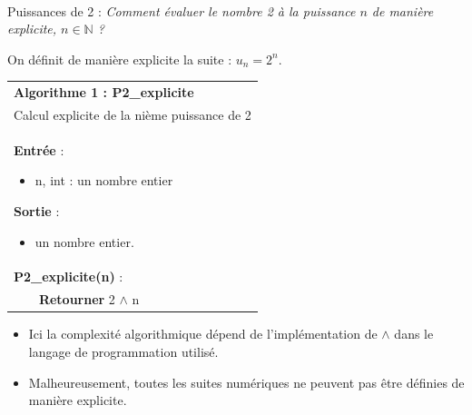 \documentclass[10pt,fleqn]{article} %
\newcommand{\bfsf}[1]{\small\textbf{\textsf{#1}}}%
\begin{document}
\begin{exemple}
$\;$

Puissances de 2 : \textit{Comment évaluer le nombre 2 à la puissance $n$ de manière explicite, $n\in \mathbb{N}$ ?}

On définit de manière explicite la suite :  $u_n=2^n$.

\begin{pseudo}
\begin{tabular}{p{.5cm}p{6cm}}
\hline
\multicolumn{2}{l}{ \textbf{Algorithme 1 : P2\_explicite}}\\
\multicolumn{2}{l}{Calcul explicite de la nième puissance de 2} \\
\hline
\multicolumn{2}{p{6.5cm}}{
\textbf{Entrée} : 
\begin{itemize}
\item n, int  : un nombre entier
\end{itemize}
\textbf{Sortie} : 
\begin{itemize}
\item un nombre entier.
\end{itemize}}\\
\multicolumn{2}{l}{\bfsf{P2\_explicite(n)} :}  \\
& \bfsf{Retourner} 2 $\wedge$ n\\
\hline
\end{tabular}
\end{pseudo}


\end{exemple}




\begin{rem}
\begin{itemize}
\item Ici la complexité algorithmique dépend de l'implémentation de $\wedge$ dans le langage de programmation utilisé. 
\item Malheureusement, toutes les suites numériques ne peuvent pas être définies de manière explicite.
\end{itemize}
\end{rem}
\end{document}
